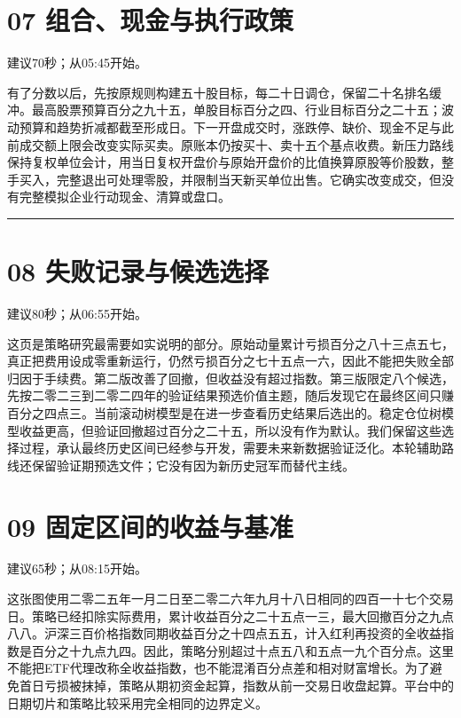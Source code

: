 \documentclass[UTF8,a4paper,12pt]{ctexart}
\begin{document}
\newpage

\section*{\color{ink}07  组合、现金与执行政策}

{\small\color{accent}建议70秒；从05:45开始。}\par

有了分数以后，先按原规则构建五十股目标，每二十日调仓，保留二十名排名缓冲。最高股票预算百分之九十五，单股目标百分之四、行业目标百分之二十五；波动预算和趋势折减都截至形成日。下一开盘成交时，涨跌停、缺价、现金不足与此前成交额上限会改变实际买卖。原账本仍按买十、卖十五个基点收费。新压力路线保持复权单位会计，用当日复权开盘价与原始开盘价的比值换算原股等价股数，整手买入，完整退出可处理零股，并限制当天新买单位出售。它确实改变成交，但没有完整模拟企业行动现金、清算或盘口。


\vspace{4mm}\noindent\textcolor{accent!40}{\rule{\textwidth}{0.4pt}}\par

\section*{\color{ink}08  失败记录与候选选择}

{\small\color{accent}建议80秒；从06:55开始。}\par

这页是策略研究最需要如实说明的部分。原始动量累计亏损百分之八十三点五七，真正把费用设成零重新运行，仍然亏损百分之七十五点一六，因此不能把失败全部归因于手续费。第二版改善了回撤，但收益没有超过指数。第三版限定八个候选，先按二零二三到二零二四年的验证结果预选价值主题，随后发现它在最终区间只赚百分之四点三。当前滚动树模型是在进一步查看历史结果后选出的。稳定仓位树模型收益更高，但验证回撤超过百分之二十五，所以没有作为默认。我们保留这些选择过程，承认最终历史区间已经参与开发，需要未来新数据验证泛化。本轮辅助路线还保留验证期预选文件；它没有因为新历史冠军而替代主线。


\newpage

\section*{\color{ink}09  固定区间的收益与基准}

{\small\color{accent}建议65秒；从08:15开始。}\par

这张图使用二零二五年一月二日至二零二六年九月十八日相同的四百一十七个交易日。策略已经扣除实际费用，累计收益百分之二十五点一三，最大回撤百分之九点八八。沪深三百价格指数同期收益百分之十四点五五，计入红利再投资的全收益指数是百分之十九点九四。因此，策略分别超过十点五八和五点一九个百分点。这里不能把ETF代理改称全收益指数，也不能混淆百分点差和相对财富增长。为了避免首日亏损被抹掉，策略从期初资金起算，指数从前一交易日收盘起算。平台中的日期切片和策略比较采用完全相同的边界定义。
\end{document}
